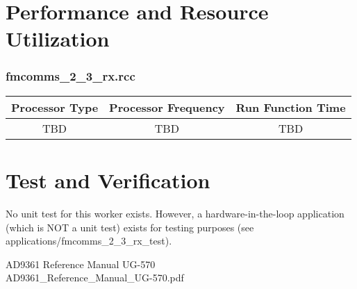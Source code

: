 \documentclass{article}
\begin{document}
\section*{Performance and Resource Utilization}
\subsubsection*{fmcomms\_2\_3\_rx.rcc}
\begin{scriptsize}
	\begin{tabular}{|c|c|c|}
		\hline
		\rowcolor{blue}
		Processor Type & Processor Frequency & Run Function Time \\
		\hline
		TBD            & TBD                 & TBD               \\
		\hline
	\end{tabular}
\end{scriptsize}

\section*{Test and Verification}
No unit test for this worker exists. However, a hardware-in-the-loop application (which is NOT a unit test) exists for testing purposes (see applications/fmcomms\_2\_3\_rx\_test).

 \begin{thebibliography}{1}


  AD9361 Reference Manual UG-570\\
 AD9361\_Reference\_Manual\_UG-570.pdf
 \end{thebibliography}
\end{document}
